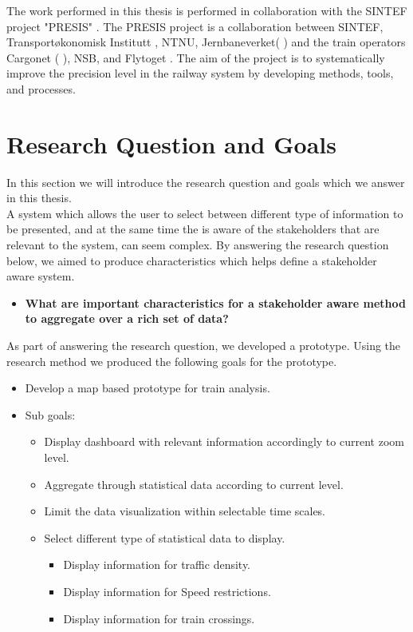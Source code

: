 The work performed in this thesis is performed in collaboration with the SINTEF
project "PRESIS" \cite{sintefPresis}. The PRESIS\cite{sintefPresis} project is 
a collaboration between SINTEF\cite{sintef}, Transportøkonomisk Institutt
\cite{transportOkonomiskInstitutt}, NTNU\cite{ntnu}, Jernbaneverket(
) and the train operators Cargonet (
), NSB\cite{nsbForside}, and Flytoget
\cite{flytoget}. The aim of the project is to systematically improve the 
precision level in the railway system by developing methods, tools, and 
processes.


\section{Research Question and Goals} %
\label{sec:intro_research_question}
In this section we will introduce the research question and goals which we 
answer in this thesis.\\

A system which allows the user to select between different type of information
to be presented, and at the same time the is aware of the stakeholders that are
relevant to the system, can seem complex. By answering the research question
below, we aimed to produce characteristics which helps define a
stakeholder aware system.\\

\begin{itemize}
	\item \textbf{What are important characteristics for a stakeholder aware 
	method to aggregate over a rich set of data?}
\end{itemize}

As part of answering the research question, we developed a prototype. Using the
research method we produced the following goals for the prototype.

\begin{itemize}
	\item Develop a map based prototype for train analysis.
	\item Sub goals:
	\begin{itemize}
		\item Display dashboard with relevant information accordingly to 
		current zoom level.
		\item Aggregate through statistical data according to current level.
		\item Limit the data visualization within selectable time scales.
		\item Select different type of statistical data to display.
		\begin{itemize}
			\item Display information for traffic density.
			\item Display information for Speed restrictions.
			\item Display information for train crossings.
		\end{itemize}
	\end{itemize}
\end{itemize}


